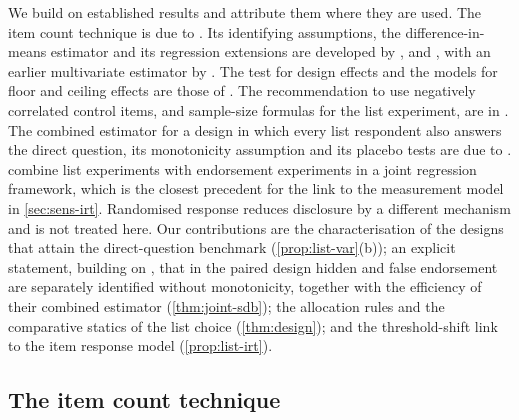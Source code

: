 We build on established results and attribute them where they are used. The item count technique is due to \citet{miller1984}. Its identifying assumptions, the difference-in-means estimator and its regression extensions are developed by \citet{imai2011}, \citet{blair2012} and \citet{glynn2013}, with an earlier multivariate estimator by \citet{corstange2009}. The test for design effects and the models for floor and ceiling effects are those of \citet{blair2012}. The recommendation to use negatively correlated control items, and sample-size formulas for the list experiment, are in \citet{glynn2013}. The combined estimator for a design in which every list respondent also answers the direct question, its monotonicity assumption and its placebo tests are due to \citet{aronow2015}.  combine list experiments with endorsement experiments in a joint regression framework, which is the closest precedent for the link to the measurement model in \cref{sec:sens-irt}. Randomised response \citep{warner1965,blair2015} reduces disclosure by a different mechanism and is not treated here. Our contributions are the characterisation of the designs that attain the direct-question benchmark (\cref{prop:list-var}(b)); an explicit statement, building on \citet{aronow2015}, that in the paired design hidden and false endorsement are separately identified without monotonicity, together with the efficiency of their combined estimator (\cref{thm:joint-sdb}); the allocation rules and the comparative statics of the list choice (\cref{thm:design}); and the threshold-shift link to the item response model (\cref{prop:list-irt}).

\subsection{The item count technique}\label{sec:sens-ict}

